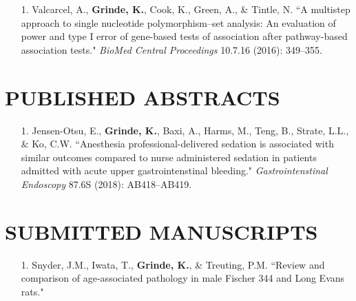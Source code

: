 \documentclass[margin]{res}
\begin{document}
\begin{resume}
\begin{itemize}
\item[1.] Valcarcel, A., \textbf{Grinde, K.}, Cook, K., Green, A., \& Tintle, N. ``A multistep approach to single nucleotide polymorphism--set analysis: An evaluation of power and type I error of gene-based tests of association after pathway-based association tests." \textit{BioMed Central Proceedings} 10.7.16 (2016): 349--355. \\
\end{itemize}

\section{PUBLISHED ABSTRACTS}

\begin{itemize}
\item[1.] Jensen-Otsu, E., \textbf{Grinde, K.}, Baxi, A., Harms, M., Teng, B., Strate, L.L., \& Ko, C.W. 
``Anesthesia professional-delivered sedation is associated with similar outcomes compared to nurse administered sedation in patients admitted with acute upper gastrointenstinal bleeding." \textit{Gastrointenstinal Endoscopy} 87.6S (2018):  AB418--AB419.\\
\end{itemize}


\section{SUBMITTED MANUSCRIPTS}
\begin{itemize}
\item[1.] Snyder, J.M., Iwata, T., \textbf{Grinde, K.}, \& Treuting, P.M. 
``Review and comparison of age-associated pathology in male Fischer 344 and Long Evans rats."  \\
\end{itemize}





\end{resume}
\end{document}

